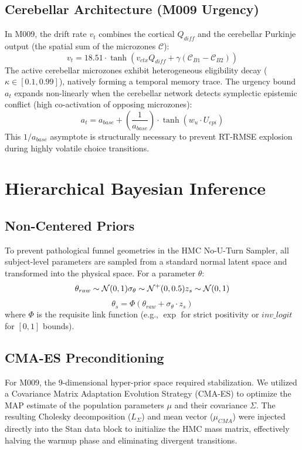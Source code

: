 \documentclass[11pt, a4paper]{article}
\begin{document}
\subsection{Cerebellar Architecture (M009 Urgency)}
In M009, the drift rate $v_t$ combines the cortical $Q_{diff}$ and the cerebellar Purkinje output (the spatial sum of the microzones $\mathcal{C}$):
\begin{equation}
v_t = 18.51 \cdot \tanh \left( v_{ctx} Q_{diff} + \gamma (\mathcal{C}_{B1} - \mathcal{C}_{B2}) \right)
\end{equation}
The active cerebellar microzones exhibit heterogeneous eligibility decay ($\kappa \in [0.1, 0.99]$), natively forming a temporal memory trace. 
The urgency bound $a_t$ expands non-linearly when the cerebellar network detects symplectic epistemic conflict (high co-activation of opposing microzones):
\begin{equation}
a_t = a_{base} + \left(\frac{1}{a_{base}}\right) \cdot \tanh(w_u \cdot U_{epi})
\end{equation}
This $1/a_{base}$ asymptote is structurally necessary to prevent RT-RMSE explosion during highly volatile choice transitions.

\section{Hierarchical Bayesian Inference}

\subsection{Non-Centered Priors}
To prevent pathological funnel geometries in the HMC No-U-Turn Sampler, all subject-level parameters are sampled from a standard normal latent space and transformed into the physical space. For a parameter $\theta$:
\begin{equation}
\theta_{raw} \sim \mathcal{N}(0, 1) \\
\sigma_\theta \sim \mathcal{N}^+(0, 0.5) \\
z_s \sim \mathcal{N}(0, 1)
\end{equation}
\begin{equation}
\theta_s = \Phi(\theta_{raw} + \sigma_\theta \cdot z_s)
\end{equation}
where $\Phi$ is the requisite link function (e.g., $\exp$ for strict positivity or $inv\_logit$ for $[0,1]$ bounds).

\subsection{CMA-ES Preconditioning}
For M009, the 9-dimensional hyper-prior space required stabilization. We utilized a Covariance Matrix Adaptation Evolution Strategy (CMA-ES) to optimize the MAP estimate of the population parameters $\mu$ and their covariance $\Sigma$. The resulting Cholesky decomposition ($L_{\Sigma}$) and mean vector ($\mu_{CMA}$) were injected directly into the Stan data block to initialize the HMC mass matrix, effectively halving the warmup phase and eliminating divergent transitions.
\end{document}
